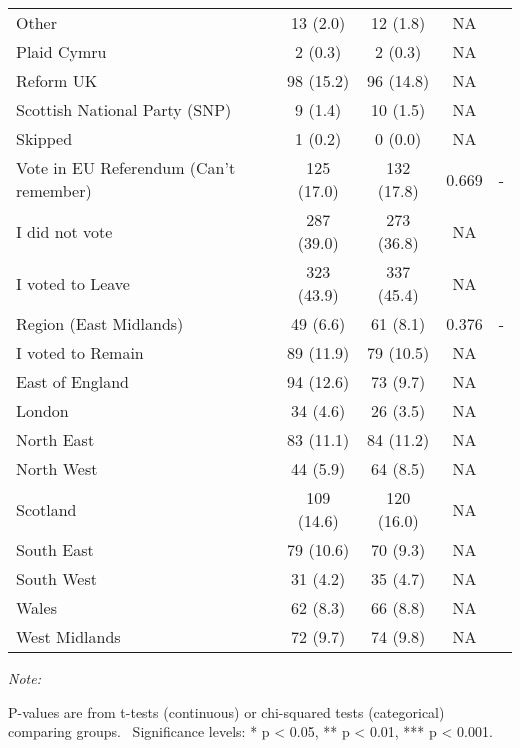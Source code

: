 \begin{table}
\begin{threeparttable}
\begin{tabular}[t]{lcccc}
Other & 13 (2.0) & 12 (1.8) & NA & \\
Plaid Cymru & 2 (0.3) & 2 (0.3) & NA & \\
\addlinespace
Reform UK & 98 (15.2) & 96 (14.8) & NA & \\
Scottish National Party (SNP) & 9 (1.4) & 10 (1.5) & NA & \\
Skipped & 1 (0.2) & 0 (0.0) & NA & \\
Vote in EU Referendum (Can’t remember) & 125 (17.0) & 132 (17.8) & 0.669 & -\\
I did not vote & 287 (39.0) & 273 (36.8) & NA & \\
\addlinespace
I voted to Leave & 323 (43.9) & 337 (45.4) & NA & \\
Region (East Midlands) & 49 (6.6) & 61 (8.1) & 0.376 & -\\
I voted to Remain & 89 (11.9) & 79 (10.5) & NA & \\
East of England & 94 (12.6) & 73 (9.7) & NA & \\
London & 34 (4.6) & 26 (3.5) & NA & \\
\addlinespace
North East & 83 (11.1) & 84 (11.2) & NA & \\
North West & 44 (5.9) & 64 (8.5) & NA & \\
Scotland & 109 (14.6) & 120 (16.0) & NA & \\
South East & 79 (10.6) & 70 (9.3) & NA & \\
South West & 31 (4.2) & 35 (4.7) & NA & \\
\addlinespace
Wales & 62 (8.3) & 66 (8.8) & NA & \\
West Midlands & 72 (9.7) & 74 (9.8) & NA & \\
\bottomrule
\end{tabular}
\begin{tablenotes}
\item \textit{Note: } 
\item P-values are from t-tests (continuous) or chi-squared tests (categorical) comparing groups. \ Significance levels: * p < 0.05, ** p < 0.01, *** p < 0.001.
\end{tablenotes}
\end{threeparttable}
\end{table}
